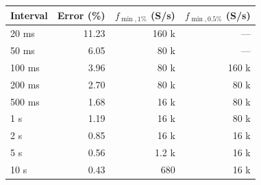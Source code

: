 \begin{tabular}{@{}lrrr@{}}
\toprule
Interval & Error (\%) & $f_{\min,1\%}$ (S/s) & $f_{\min,0.5\%}$ (S/s) \\
\midrule
20 ms & 11.23 & 160 k & --- \\
50 ms & 6.05 & 80 k & --- \\
100 ms & 3.96 & 80 k & 160 k \\
200 ms & 2.70 & 80 k & 80 k \\
500 ms & 1.68 & 16 k & 80 k \\
1 s & 1.19 & 16 k & 80 k \\
2 s & 0.85 & 16 k & 16 k \\
5 s & 0.56 & 1.2 k & 16 k \\
10 s & 0.43 & 680 & 16 k \\
\bottomrule
\end{tabular}
